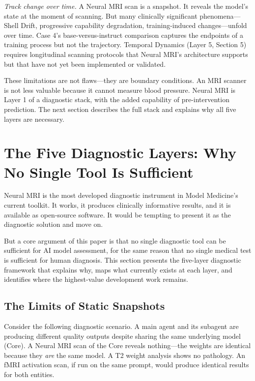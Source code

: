 \documentclass[11pt]{article}
\begin{document}
\emph{Track change over time.} A Neural MRI scan is a snapshot. It reveals the model's state at the moment of scanning. But many clinically significant phenomena---Shell Drift, progressive capability degradation, training-induced changes---unfold over time. Case 4's base-versus-instruct comparison captures the endpoints of a training process but not the trajectory. Temporal Dynamics (Layer 5, Section 5) requires longitudinal scanning protocols that Neural MRI's architecture supports but that have not yet been implemented or validated.

These limitations are not flaws---they are boundary conditions. An MRI scanner is not less valuable because it cannot measure blood pressure. Neural MRI is Layer 1 of a diagnostic stack, with the added capability of pre-intervention prediction. The next section describes the full stack and explains why all five layers are necessary.

\section{The Five Diagnostic Layers: Why No Single Tool Is Sufficient}

Neural MRI is the most developed diagnostic instrument in Model Medicine's current toolkit. It works, it produces clinically informative results, and it is available as open-source software. It would be tempting to present it as the diagnostic solution and move on.

But a core argument of this paper is that no single diagnostic tool can be sufficient for AI model assessment, for the same reason that no single medical test is sufficient for human diagnosis. This section presents the five-layer diagnostic framework that explains why, maps what currently exists at each layer, and identifies where the highest-value development work remains.

\subsection{The Limits of Static Snapshots}

Consider the following diagnostic scenario. A main agent and its subagent are producing different quality outputs despite sharing the same underlying model (Core). A Neural MRI scan of the Core reveals nothing---the weights are identical because they \emph{are} the same model. A T2 weight analysis shows no pathology. An fMRI activation scan, if run on the same prompt, would produce identical results for both entities.
\end{document}
